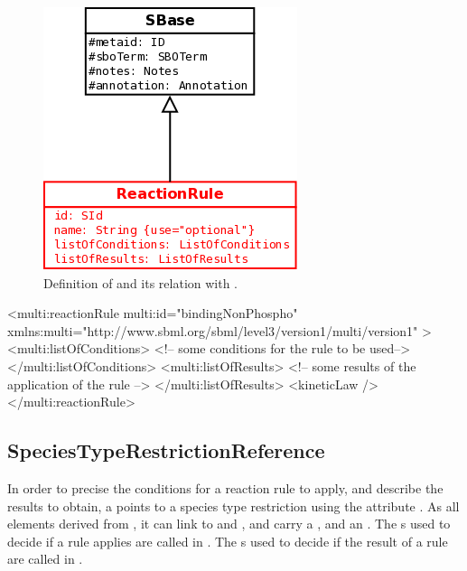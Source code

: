 \begin{figure}[H]
\begin{center}
\includegraphics[scale=0.3]{figs/pngs/ReactionRuleClass.png} 
\caption{Definition of  and its relation with .}
\label{fig:ReactionRuleClass}
\end{center}
\end{figure}

\begin{example}
<multi:reactionRule multi:id="bindingNonPhospho"
         xmlns:multi="http://www.sbml.org/sbml/level3/version1/multi/version1" >
  <multi:listOfConditions>
    <!-- some conditions for the rule to be used-->
  </multi:listOfConditions>
  <multi:listOfResults>
    <!-- some results of the application of the rule -->
  </multi:listOfResults>
  <kineticLaw />
</multi:reactionRule>
\end{example}

\subsection{SpeciesTypeRestrictionReference}

In order to precise the conditions for a reaction rule to apply, and describe the results to obtain, a  points to a species type restriction using the attribute . As all elements derived from , it can link to  and , and carry a , and an . The s used to decide if a rule applies are called in . The s used to decide if the result of a rule are called in .

